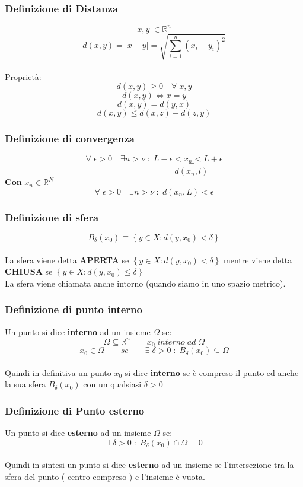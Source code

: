 \documentclass[fontsize = 20px, paper = a4]{article}
\begin{document}
\subsubsection{Definizione di Distanza}
\hspace*{1cm}
$$x,y \; \in \mathbb{R}^n$$
$$d(x,y) = |x-y| = \sqrt{\sum_{i = 1}^{n}(x_i - y_i)^2} $$ \\ 
Proprietà:
$$d(x,y) \ge 0 \quad \forall \; x,y$$
$$d(x,y) \Leftrightarrow x = y$$
$$d(x,y) = d(y,x) $$
$$d(x,y) \le d(x,z) + d(z,y)$$
\subsubsection{Definizione di convergenza}
\hspace*{1cm}
$$\forall \; \epsilon > 0 \quad \exists n > \nu \; : \; L - \epsilon < x_n < L+\epsilon$$
$$\quad\quad\quad\quad\quad\quad\quad\quad\quad \equiv$$
$$\quad\quad\quad\quad\quad\quad\quad\quad\quad d(x_n,l)$$
\textbf{Con} $x_n \in \mathbb{R}^N$
$$\forall \; \epsilon > 0 \quad \exists n > \nu \; : \; d(x_n,L) < \epsilon$$
 
\subsubsection{Definizione di sfera}
\hspace*{1cm}
$$B_\delta \left(x_0 \right) \equiv \left\{ y\in X : d \left( y,x_0\right )  < \delta  \right\}$$  \\
La sfera viene detta \textbf{APERTA} se $\left\{ y\in X : d \left( y,x_0\right )  < \delta \right\}$ mentre viene detta \textbf{CHIUSA} se $\left\{ y\in X : d \left( y,x_0  \right ) \le \delta \right\}$\\
La sfera viene chiamata anche intorno (quando siamo in uno spazio metrico).
\subsubsection{Definizione di punto interno}
Un punto si dice \textbf{interno} ad un insieme $\Omega$ se: \\
$$\Omega \subseteq \mathbb{R}^n \qquad x_0 \; interno \; ad \; \Omega$$
$$x_0 \in \Omega \qquad se \qquad \exists \; \delta > 0 \; : \; B_\delta(x_0) \subseteq \Omega$$ \\
Quindi in definitiva un punto $x_0$ si dice \textbf{interno} se è compreso il punto ed anche la sua sfera $B_\delta(x_0)$ con un qualsiasi $\delta > 0$
\subsubsection{Definizione di Punto esterno}
Un punto si dice \textbf{esterno} ad un insieme $\Omega $ se:
$$\exists \; \delta > 0 \; : \;  B_\delta(x_0) \cap \Omega = 0$$ \\
Quindi in sintesi un punto si dice \textbf{esterno} ad un insieme se l'intersezione tra la sfera del punto ( centro compreso ) e l'insieme è vuota.
\end{document}
